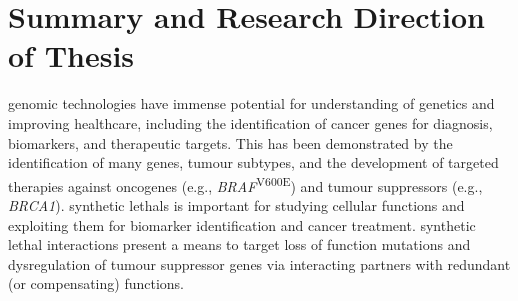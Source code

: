 





\section{Summary and Research Direction of Thesis}

\Gls{genomic} technologies have immense potential for understanding of genetics and improving healthcare, including the identification of \glspl{cancer gene} for diagnosis, biomarkers, and therapeutic targets. This has been demonstrated by the identification of many  genes, tumour subtypes, and the development of targeted therapies against \glspl{oncogene} (e.g., \textit{BRAF}\textsuperscript{V600E}) and \glspl{tumour suppressor} (e.g., \textit{BRCA1}). \Glspl{synthetic lethal} is important for studying cellular functions and exploiting them for biomarker identification and cancer treatment. \Gls{synthetic lethal} interactions present a means to target loss of function \glspl{mutation} and dysregulation of \gls{tumour suppressor} genes via interacting partners with redundant (or compensating) functions.  

